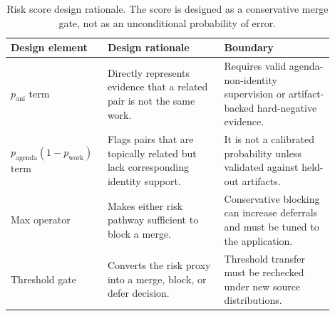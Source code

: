 \documentclass[11pt]{article}
\begin{document}
\begin{table}[H]
\caption{Risk score design rationale. The score is designed as a conservative merge gate, not as an unconditional probability of error.}
\label{tab:risk-score-rationale}
\centering
\footnotesize
\setlength{\tabcolsep}{3pt}
\begin{tabular}{L{0.24\linewidth}L{0.34\linewidth}L{0.32\linewidth}}
\toprule
Design element & Design rationale & Boundary \\
\midrule
$p_{\mathrm{ani}}$ term & Directly represents evidence that a related pair is not the same work. & Requires valid agenda-non-identity supervision or artifact-backed hard-negative evidence. \\
$p_{\mathrm{agenda}}(1-p_{\mathrm{work}})$ term & Flags pairs that are topically related but lack corresponding identity support. & It is not a calibrated probability unless validated against held-out artifacts. \\
Max operator & Makes either risk pathway sufficient to block a merge. & Conservative blocking can increase deferrals and must be tuned to the application. \\
Threshold gate & Converts the risk proxy into a merge, block, or defer decision. & Threshold transfer must be rechecked under new source distributions. \\
\bottomrule
\end{tabular}
\end{table}
\end{document}
